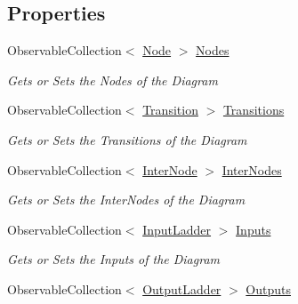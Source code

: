 \subsection*{Properties}
\begin{DoxyCompactItemize}
\item 
Observable\+Collection$<$ \hyperlink{class_prototipo_t_f_g_1_1_node}{Node} $>$ \hyperlink{class_prototipo_t_f_g_1_1_diagram_data_a38c2bb132b0998e9794dc8cd43e80784}{Nodes}
\begin{DoxyCompactList}\small\item\em Gets or Sets the Nodes of the Diagram \end{DoxyCompactList}\item 
Observable\+Collection$<$ \hyperlink{class_prototipo_t_f_g_1_1_transition}{Transition} $>$ \hyperlink{class_prototipo_t_f_g_1_1_diagram_data_adcc7d046268385bf8ed61820883e87b1}{Transitions}
\begin{DoxyCompactList}\small\item\em Gets or Sets the Transitions of the Diagram \end{DoxyCompactList}\item 
Observable\+Collection$<$ \hyperlink{class_prototipo_t_f_g_1_1_inter_node}{Inter\+Node} $>$ \hyperlink{class_prototipo_t_f_g_1_1_diagram_data_a26f7e4e03732de44df9d8f8a07466f41}{Inter\+Nodes}
\begin{DoxyCompactList}\small\item\em Gets or Sets the Inter\+Nodes of the Diagram \end{DoxyCompactList}\item 
Observable\+Collection$<$ \hyperlink{class_prototipo_t_f_g_1_1_input_ladder}{Input\+Ladder} $>$ \hyperlink{class_prototipo_t_f_g_1_1_diagram_data_a4163f7d53233b49ac0c6e4603a9c7e77}{Inputs}
\begin{DoxyCompactList}\small\item\em Gets or Sets the Inputs of the Diagram \end{DoxyCompactList}\item 
Observable\+Collection$<$ \hyperlink{class_prototipo_t_f_g_1_1_output_ladder}{Output\+Ladder} $>$ \hyperlink{class_prototipo_t_f_g_1_1_diagram_data_ad071878319be0edcbc7f92c7e189a2ba}{Outputs}

\end{DoxyCompactItemize}
